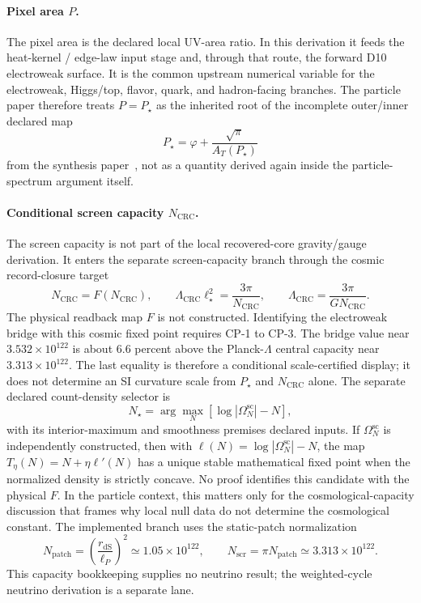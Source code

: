 \documentclass[11pt]{article}
\begin{document}
\paragraph{Pixel area \(P\).}
The pixel area is the declared local UV-area ratio. In this derivation it feeds the heat-kernel /
edge-law input stage and, through that route, the forward D10 electroweak surface. It is the
common upstream numerical variable for the electroweak, Higgs/top, flavor, quark, and
hadron-facing branches. The particle paper therefore treats \(P=P_\star\) as the inherited
root of the incomplete outer/inner declared map
\[
P_\star=\varphi+\frac{\sqrt{\pi}}{A_T(P_\star)}
\]
from the synthesis paper~\cite{ophsynthesis}, not as a quantity derived again inside the
particle-spectrum argument itself.

\paragraph{Conditional screen capacity \(N_{\mathrm{CRC}}\).}
The screen capacity is not part of the local recovered-core gravity/gauge derivation. It enters
the separate screen-capacity branch through the cosmic record-closure target
\[
N_{\mathrm{CRC}}=F(N_{\mathrm{CRC}}),
\qquad
\Lambda_{\mathrm{CRC}}\ell_\star^2=\frac{3\pi}{N_{\mathrm{CRC}}},
\qquad
\Lambda_{\mathrm{CRC}}=\frac{3\pi}{G N_{\mathrm{CRC}}}.
\]
The physical readback map \(F\) is not constructed. Identifying the electroweak bridge with this
cosmic fixed point requires CP-1 to CP-3. The bridge value near
\(3.532\times10^{122}\) is about \(6.6\) percent above the Planck-\(\Lambda\) central capacity
near \(3.313\times10^{122}\). The last equality is therefore a conditional scale-certified
display; it does not determine an SI curvature scale from \(P_\star\) and
\(N_{\mathrm{CRC}}\) alone.
The separate declared count-density selector is
\[
N_\star=\arg\max_N\left[\log|\Omega^{\mathrm{sc}}_N|-N\right],
\]
with its interior-maximum and smoothness premises declared inputs.
If \(\Omega^{\mathrm{sc}}_N\) is independently constructed, then with
\(\ell(N)=\log|\Omega^{\mathrm{sc}}_N|-N\), the map
\(T_\eta(N)=N+\eta\ell'(N)\) has a unique stable mathematical fixed point when the normalized
density is strictly concave. No proof identifies this candidate with the physical \(F\).
In the particle context, this matters only for the cosmological-capacity discussion that
frames why local null data do not determine the
cosmological constant. The implemented branch uses the static-patch normalization
\[
N_{\mathrm{patch}}=\left(\frac{r_{\mathrm{dS}}}{\ell_P}\right)^2\simeq1.05\times10^{122},
\qquad
N_{\mathrm{scr}}=\pi N_{\mathrm{patch}}\simeq3.313\times10^{122}.
\]
This capacity bookkeeping supplies no neutrino result; the weighted-cycle neutrino derivation is
a separate lane.
\end{document}
